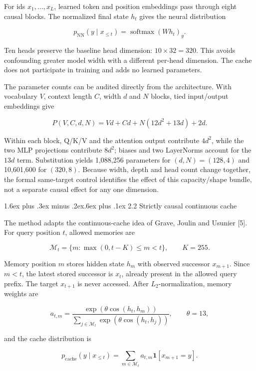 \documentclass[11pt]{article}
\makeatletter
\renewcommand\subsection{\@startsection{subsection}{2}{0pt}%
  {1.6ex plus .3ex minus .2ex}{.6ex plus .1ex}%
  {\normalfont\normalsize\bfseries}}
\makeatother
\begin{document}
For ids \(x_1,\ldots,x_L\), learned token and position embeddings pass
through eight causal blocks. The normalized final state \(h_t\) gives
the neural distribution

\[
p_{\mathrm{NN}}(y\mid x_{\leq t})=
\operatorname{softmax}(Wh_t)_y.
\]

Ten heads preserve the baseline head dimension: \(10\times32=320\). This
avoids confounding greater model width with a different per-head
dimension. The cache does not participate in training and adds no
learned parameters.

The parameter counts can be audited directly from the architecture. With
vocabulary \(V\), context length \(C\), width \(d\) and \(N\) blocks, tied
input/output embeddings give

\[
P(V,C,d,N)=Vd+Cd+N(12d^2+13d)+2d.
\]

Within each block, Q/K/V and the attention output contribute \(4d^2\),
while the two MLP projections contribute \(8d^2\); biases and two
LayerNorms account for the \(13d\) term. Substitution yields 1,088,256
parameters for \((d,N)=(128,4)\) and 10,601,600 for \((320,8)\). Because
width, depth and head count change together, the formal same-target
control identifies the effect of this capacity/shape bundle, not a
separate causal effect for any one dimension.

\subsection{2.2 Strictly causal continuous
cache}\label{22-strictly-causal-continuous-cache}

The method adapts the continuous-cache idea of Grave, Joulin and Usunier
{[}5{]}. For query position \(t\), allowed memories are

\[
\mathcal{M}_t=\{m:\max(0,t-K)\leq m<t\},\qquad K=255.
\]

Memory position \(m\) stores hidden state \(h_m\) with observed
successor \(x_{m+1}\). Since \(m<t\), the latest stored successor is
\(x_t\), already present in the allowed query prefix. The target
\(x_{t+1}\) is never accessed. After \(L_2\)-normalization, memory
weights are

\[
a_{t,m}=\frac{\exp(\theta\cos(h_t,h_m))}
{\sum_{j\in\mathcal{M}_t}\exp(\theta\cos(h_t,h_j))},
\qquad \theta=13,
\]

and the cache distribution is

\[
p_{\mathrm{cache}}(y\mid x_{\leq t})=
\sum_{m\in\mathcal{M}_t}a_{t,m}\mathbf{1}[x_{m+1}=y].
\]
\end{document}

